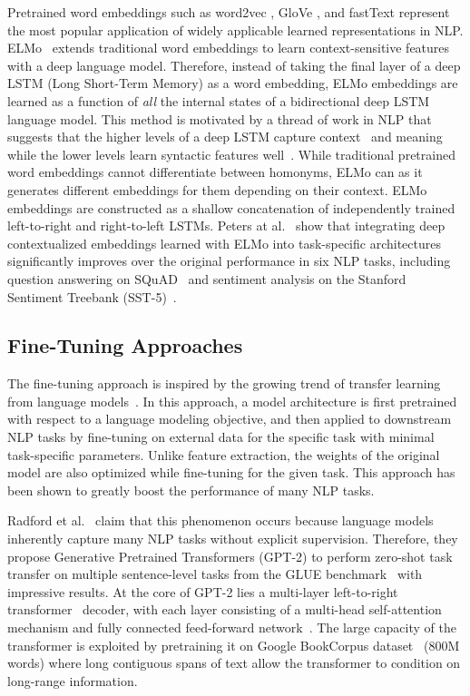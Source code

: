 Pretrained word embeddings such as word2vec \cite{mikolov2013distributed}, GloVe \cite{pennington2014glove}, and fastText \cite{bojanowski2017enriching} represent the most popular application of widely applicable learned representations in NLP.
ELMo~\cite{peters2018deep} extends traditional word embeddings to learn context-sensitive features with a deep language model.
Therefore, instead of taking the final layer of a deep LSTM (Long Short-Term Memory) as a word embedding, ELMo embeddings are learned as a function of \textit{all} the internal states of a bidirectional deep LSTM language model.
This method is motivated by a thread of work in NLP that suggests that the higher levels of a deep LSTM capture context~\cite{melamud2016context2vec} and meaning while the lower levels learn syntactic features well~\cite{belinkov2017neural}.
While traditional pretrained word embeddings cannot differentiate between homonyms, ELMo can as it generates different embeddings for them depending on their context.
ELMo embeddings are constructed as a shallow concatenation of independently trained left-to-right and right-to-left LSTMs.
Peters at al.~\cite{peters2018deep} show that integrating deep contextualized embeddings learned with ELMo into task-specific architectures significantly improves over the original performance in six NLP tasks, including question answering on SQuAD~\cite{rajpurkar2016squad} and sentiment analysis on the Stanford Sentiment Treebank (SST-5)~\cite{socher2013recursive}.

\subsection{Fine-Tuning Approaches}

The fine-tuning approach is inspired by the growing trend of transfer learning from language models~\cite{devlin2018bert}.
In this approach, a model architecture is first pretrained with respect to a language modeling objective, and then applied to downstream NLP tasks by fine-tuning on external data for the specific task with minimal task-specific parameters.
Unlike feature extraction, the weights of the original model are also optimized while fine-tuning for the given task.
This approach has been shown to greatly boost the performance of many NLP tasks.

Radford et al.~\cite{radford2019language} claim that this phenomenon occurs because language models inherently capture many NLP tasks without explicit supervision.
Therefore, they propose Generative Pretrained Transformers (GPT-2) to perform zero-shot task transfer on multiple sentence-level tasks from the GLUE benchmark~\cite{wang2018glue} with impressive results.
At the core of GPT-2 lies a multi-layer left-to-right transformer~\cite{vaswani2017attention} decoder, with each layer consisting of a multi-head self-attention mechanism and fully connected feed-forward network~\cite{radford2018improving}.
The large capacity of the transformer is exploited by pretraining it on Google BookCorpus dataset~\cite{zhu2015aligning} (800M words) where long contiguous spans of text allow the transformer to condition on long-range information.

